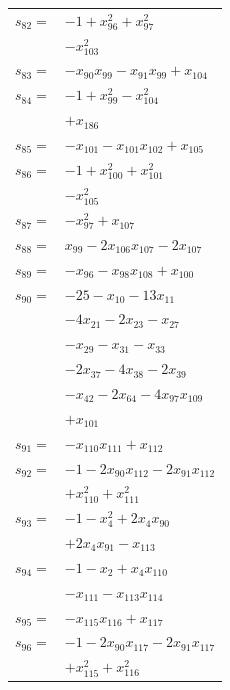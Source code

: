 \begin{longtable}{@{}r@{\;}l@{}}
\(s_{82}=\) & \(\displaystyle -1 +x_{96}^{2} +x_{97}^{2}\) \\
 & \(\displaystyle -x_{103}^{2}\) \\[3pt]
\(s_{83}=\) & \(\displaystyle -x_{90}x_{99} -x_{91}x_{99} +x_{104}\) \\[3pt]
\(s_{84}=\) & \(\displaystyle -1 +x_{99}^{2} -x_{104}^{2}\) \\
 & \(\displaystyle +x_{186}\) \\[3pt]
\(s_{85}=\) & \(\displaystyle -x_{101} -x_{101}x_{102} +x_{105}\) \\[3pt]
\(s_{86}=\) & \(\displaystyle -1 +x_{100}^{2} +x_{101}^{2}\) \\
 & \(\displaystyle -x_{105}^{2}\) \\[3pt]
\(s_{87}=\) & \(\displaystyle -x_{97}^{2} +x_{107}\) \\[3pt]
\(s_{88}=\) & \(\displaystyle x_{99} -2x_{106}x_{107} -2x_{107}\) \\[3pt]
\(s_{89}=\) & \(\displaystyle -x_{96} -x_{98}x_{108} +x_{100}\) \\[3pt]
\(s_{90}=\) & \(\displaystyle -25 -x_{10} -13x_{11}\) \\
 & \(\displaystyle -4x_{21} -2x_{23} -x_{27}\) \\
 & \(\displaystyle -x_{29} -x_{31} -x_{33}\) \\
 & \(\displaystyle -2x_{37} -4x_{38} -2x_{39}\) \\
 & \(\displaystyle -x_{42} -2x_{64} -4x_{97}x_{109}\) \\
 & \(\displaystyle +x_{101}\) \\[3pt]
\(s_{91}=\) & \(\displaystyle -x_{110}x_{111} +x_{112}\) \\[3pt]
\(s_{92}=\) & \(\displaystyle -1 -2x_{90}x_{112} -2x_{91}x_{112}\) \\
 & \(\displaystyle +x_{110}^{2} +x_{111}^{2}\) \\[3pt]
\(s_{93}=\) & \(\displaystyle -1 -x_{4}^{2} +2x_{4}x_{90}\) \\
 & \(\displaystyle +2x_{4}x_{91} -x_{113}\) \\[3pt]
\(s_{94}=\) & \(\displaystyle -1 -x_{2} +x_{4}x_{110}\) \\
 & \(\displaystyle -x_{111} -x_{113}x_{114}\) \\[3pt]
\(s_{95}=\) & \(\displaystyle -x_{115}x_{116} +x_{117}\) \\[3pt]
\(s_{96}=\) & \(\displaystyle -1 -2x_{90}x_{117} -2x_{91}x_{117}\) \\
 & \(\displaystyle +x_{115}^{2} +x_{116}^{2}\) \\[3pt]

\end{longtable}
